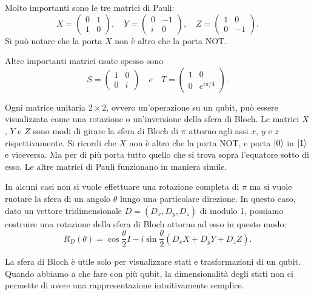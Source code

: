 Molto importanti sono le tre matrici di Pauli: 
\begin{equation}
    X=\begin{pmatrix}
        0&1\\1&0
    \end{pmatrix},
    \quad Y = \begin{pmatrix}
        0&-1 \\ i&0
    \end{pmatrix},
    \quad Z = \begin{pmatrix}
        1&0 \\ 0&-1
    \end{pmatrix}.
\end{equation}
Si può notare che la porta $X$ non è altro che la porta NOT. 

Altre importanti matrici usate spesso sono 
\begin{equation}
    S=\begin{pmatrix}
        1&0\\0&i
    \end{pmatrix}
    \quad e \quad T = \begin{pmatrix}
        1&0\\0&e^{i\pi/4}
    \end{pmatrix}.
\end{equation}

Ogni matrice unitaria $2\times2$, ovvero un'operazione su un qubit, 
può essere visualizzata come una rotazione o un'inversione della 
sfera di Bloch. Le matrici $X$, $Y$ e $Z$ sono modi di girare la 
sfera di Bloch di $\pi$ attorno agli assi $x$, $y$ e $z$ rispettivamente. 
Si ricordi che $X$ non è altro che la porta NOT, e porta $\ket{0}$ in $\ket{1}$ 
e viceversa. Ma per di più porta tutto quello che si trova sopra l'equatore 
sotto di esso. Le altre matrici di Pauli funzionano in maniera simile. 

In alcuni casi non si vuole effettuare una rotazione completa di $\pi$ 
ma si vuole ruotare la sfera di un angolo $\theta$ lungo una particolare direzione. 
In questo caso, dato un vettore tridimensionale $D=(D_x, D_y, D_z)$ di modulo 1, 
possiamo costruire una rotazione della sfera di Bloch attorno ad esso in questo 
modo: 
\begin{equation}
    R_D(\theta)=\cos\frac{\theta}{2}I - i \sin \frac{\theta}{2} 
    (D_x X + D_y Y + D_z Z). 
\end{equation}

La sfera di Bloch è utile solo per visualizzare stati e trasformazioni di un qubit. 
Quando abbiamo a che fare con più qubit, la dimensionalità degli stati non ci 
permette di avere una rappresentazione intuitivamente semplice. 

